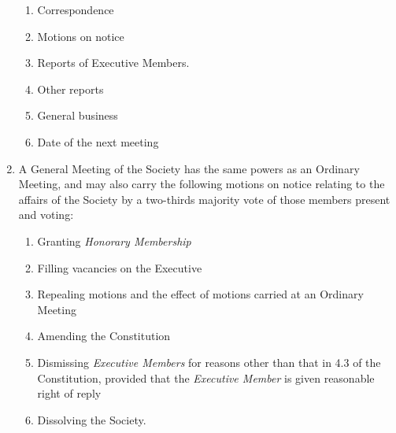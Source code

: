 \documentclass[11pt]{article}
\begin{document}
\begin{enumerate}[\thesection .1]
\begin{enumerate}[\hspace{5mm}1.]
    	\item Correspondence
    	\item Motions on notice
    	\item Reports of Executive Members.
    	\item Other reports
    	\item General business
    	\item Date of the next meeting
    \end{enumerate}
    \item A General Meeting of the Society has the same powers as an Ordinary Meeting, and may also carry the following motions on notice relating to the affairs of the Society by a two-thirds majority vote of those members present and voting:
    \begin{enumerate}[\hspace{5mm}i.]
        \item Granting \textit{Honorary Membership}
        \item Filling vacancies on the Executive
        \item Repealing motions and the effect of motions carried at an Ordinary Meeting
        \item Amending the Constitution
        \item Dismissing \textit{Executive Members} for reasons other than that in 4.3 of the Constitution, provided that the \textit{Executive Member} is given reasonable right of reply
        \item Dissolving the Society.
    \end{enumerate}
\end{enumerate}
\end{document}
